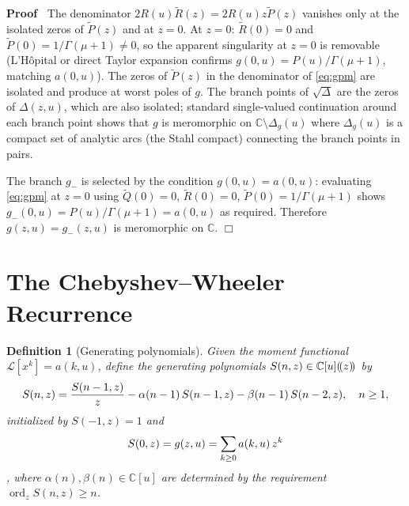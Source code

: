 \documentclass{article}
\newcommand{\tmop}[1]{\ensuremath{\operatorname{#1}}}
\newenvironment{proof}{\noindent\textbf{Proof\ }}{\hspace*{\fill}$\Box$\medskip}
\newtheorem{definition}{Definition}
\newcommand{\ord}{\tmop{ord}}
\newcommand{\C}{\mathbb{C}}
\newcommand{\Lk}{\mathcal{L}}
\begin{document}
\begin{proof}
  The denominator $2 R (u)  \tilde{R} (z) = 2 R (u) z \tilde{P} (z)$ vanishes
  only at the isolated zeros of $\tilde{P} (z)$ and at $z = 0$. At $z = 0$:
  $\tilde{R} (0) = 0$ and $\tilde{P} (0) = 1 / \Gamma (\mu + 1) \ne 0$, so the
  apparent singularity at $z = 0$ is removable (L'H{\^o}pital or direct Taylor
  expansion confirms $g (0, u) = P (u) / \Gamma (\mu + 1)$, matching $a (0,
  u)$). The zeros of $\tilde{P} (z)$ in the denominator of \eqref{eq:gpm} are
  isolated and produce at worst poles of $g$. The branch points of
  $\sqrt{\Delta}$ are the zeros of $\Delta (z, u)$, which are also isolated;
  standard single-valued continuation around each branch point shows that $g$
  is meromorphic on $\C \setminus \Delta_g (u)$ where $\Delta_g (u)$ is a
  compact set of analytic arcs (the Stahl compact) connecting the branch
  points in pairs.
  
  The branch $g_-$ is selected by the condition $g (0, u) = a (0, u)$:
  evaluating \eqref{eq:gpm} at $z = 0$ using $\tilde{Q} (0) = 0$, $\tilde{R}
  (0) = 0$, $\tilde{P} (0) = 1 / \Gamma (\mu + 1)$ shows $g_- (0, u) = P (u) /
  \Gamma (\mu + 1) = a (0, u)$ as required. Therefore $g (z, u) = g_- (z, u)$
  is meromorphic on $\C$.
\end{proof}

\section{The Chebyshev--Wheeler Recurrence}\label{sec:CW}

\begin{definition}
  [Generating polynomials]\label{def:Snz}Given the moment functional $\Lk
  [x^k] = a (k, u)$, define the generating polynomials $S (n, z) \in \C [u]
  (\hspace{-0.17em} (z) \hspace{-0.17em})$ by
  \begin{equation}
    S (n, z) = \frac{S (n - 1, z)}{z} - \alpha (n - 1)  \hspace{0.17em} S (n -
    1, z) - \beta (n - 1)  \hspace{0.17em} S (n - 2, z), \quad n \ge 1,
    \label{eq:CWrecurrence}
  \end{equation}
  initialized by $S (- 1, z) = 1$ and
  \begin{equation}
    S (0, z) = g (z, u) = \sum_{k \ge 0} a (k, u)  \hspace{0.17em} z^k
  \end{equation}
  , where $\alpha (n), \beta (n) \in \C [u]$ are determined by the requirement
  $\ord_z S (n, z) \ge n$.
\end{definition}
\end{document}
